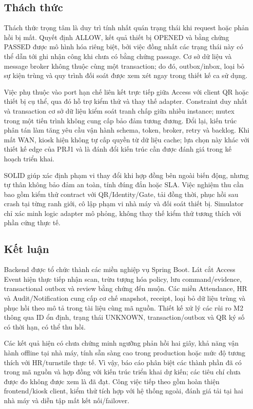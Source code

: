 \subsection{Thách thức}
\label{subsec:reflection}
Thách thức trọng tâm là duy trì tính nhất quán trạng thái khi request hoặc phản hồi bị mất. Quyết định ALLOW, kết quả thiết bị OPENED và bằng chứng PASSED được mô hình hóa riêng biệt, bởi việc đồng nhất các trạng thái này có thể dẫn tới ghi nhận công khi chưa có bằng chứng passage. Cơ sở dữ liệu và message broker không thuộc cùng một transaction; do đó, outbox/inbox, loại bỏ sự kiện trùng và quy trình đối soát được xem xét ngay trong thiết kế ca sử dụng.

Việc phụ thuộc vào port hạn chế liên kết trực tiếp giữa Access với client QR hoặc thiết bị cụ thể, qua đó hỗ trợ kiểm thử và thay thế adapter. Constraint duy nhất và transaction cơ sở dữ liệu kiểm soát tranh chấp giữa nhiều instance; mutex trong một tiến trình không cung cấp bảo đảm tương đương. Đổi lại, kiến trúc phân tán làm tăng yêu cầu vận hành schema, token, broker, retry và backlog. Khi mất WAN, kiosk hiện không tự cấp quyền từ dữ liệu cache; lựa chọn này khác với thiết kế edge của PRJ1 và là đánh đổi kiến trúc cần được đánh giá trong kế hoạch triển khai.

SOLID giúp xác định phạm vi thay đổi khi hợp đồng bên ngoài biến động, nhưng tự thân không bảo đảm an toàn, tính đúng đắn hoặc SLA. Việc nghiệm thu cần bao gồm kiểm thử contract với QR/Identity/Gate, tải đồng thời, phục hồi sau crash tại từng ranh giới, cô lập phạm vi nhà máy và đối soát thiết bị. Simulator chỉ xác minh logic adapter mô phỏng, không thay thế kiểm thử tương thích với phần cứng thực tế.

\subsection{Kết luận}
\label{subsec:conclusion}
Backend được tổ chức thành các miền nghiệp vụ Spring Boot. Lát cắt Access Event hiện thực tiếp nhận scan, trừu tượng hóa policy, lưu command/evidence, transactional outbox và review bằng chứng đến muộn. Các miền Attendance, HR và Audit/Notification cung cấp cơ chế snapshot, receipt, loại bỏ dữ liệu trùng và phục hồi theo mô tả trong tài liệu cùng mã nguồn. Thiết kế xử lý các rủi ro M2 thông qua ID ổn định, trạng thái UNKNOWN, transaction/outbox và QR ký số có thời hạn, có thể thu hồi.

Các kết quả hiện có chưa chứng minh ngưỡng phản hồi hai giây, khả năng vận hành offline tại nhà máy, tính sẵn sàng cao trong production hoặc mức độ tương thích với HR/turnstile thực tế. Vì vậy, báo cáo phân biệt các thành phần đã có trong mã nguồn và hợp đồng với kiến trúc triển khai dự kiến; các tiêu chí chưa được đo không được xem là đã đạt. Công việc tiếp theo gồm hoàn thiện frontend/kiosk client, kiểm thử tích hợp với hệ thống ngoài, đánh giá tải tại hai nhà máy và diễn tập mất kết nối/failover.




